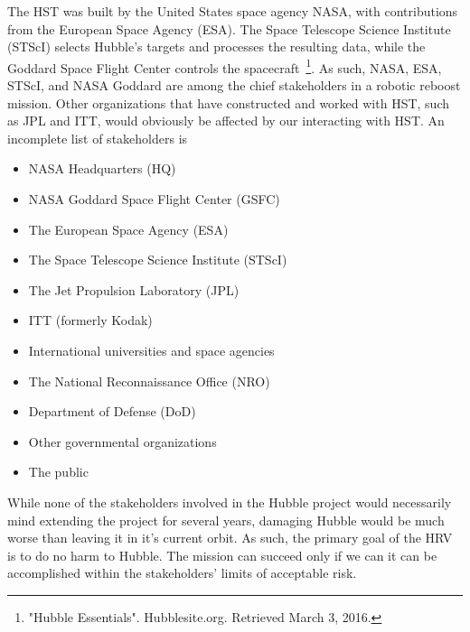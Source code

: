 \documentclass[onecolumn,10pt]{jhwhw}
\begin{document}
The HST was built by the United States space agency NASA, with contributions from the European Space Agency (ESA). The Space Telescope Science Institute (STScI) selects Hubble's targets and processes the resulting data, while the Goddard Space Flight Center controls the spacecraft~\footnote{"Hubble Essentials". Hubblesite.org. Retrieved March 3, 2016.}. As such, NASA, ESA, STScI, and NASA Goddard are among the chief stakeholders in a robotic reboost mission. Other organizations that have constructed and worked with HST, such as JPL and ITT, would obviously be affected by our interacting with HST. An incomplete list of stakeholders is
\begin{itemize}
\setlength\itemsep{0em}
\item NASA Headquarters (HQ)
\item NASA Goddard Space Flight Center (GSFC)
\item The European Space Agency (ESA)
\item The Space Telescope Science Institute (STScI)
\item The Jet Propulsion Laboratory (JPL)
\item ITT (formerly Kodak)
\item International universities and space agencies
\item The National Reconnaissance Office (NRO)
\item Department of Defense (DoD)
\item Other governmental organizations
\item The public
\end{itemize}

While none of the stakeholders involved in the Hubble project would necessarily mind extending the project for several years, damaging Hubble would be much worse than leaving it in it's current orbit. As such, the primary goal of the HRV is to do no harm to Hubble. The mission can succeed only if we can it can be accomplished within the stakeholders' limits of acceptable risk.


\end{document}
